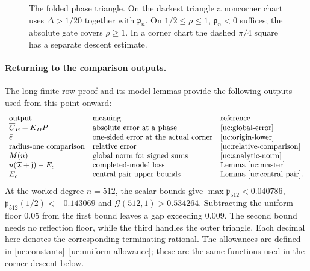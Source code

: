 \begin{figure}[ht]
\centering
{}
\caption{The folded phase triangle. On the darkest triangle a
noncorner chart uses $\Delta>1/20$ together with $\mathfrak p_n$.
On $1/2\leq\rho\leq1$, $\mathfrak p_n<0$ suffices; the absolute gate covers
$\rho\geq1$. In a corner chart the dashed $\pi/4$ square has a
separate descent estimate.}
\label{fig:phase-regions}
\end{figure}



\paragraph{Returning to the comparison outputs.}
The long finite-row proof and its model lemmas provide the following
outputs used from this point onward:
\[
\begin{array}{l@{\quad}l@{\quad}l}
\text{output}&\text{meaning}&\text{reference}\\
\overline C_E+K_DP&\text{absolute error at a phase}&\eqref{uc:global-error}\\
\bar e&\text{one-sided error at the actual corner}&\eqref{uc:origin-lower}\\
\text{radius-one comparison}&\text{relative error}&\eqref{uc:relative-comparison}\\
M(n)&\text{global norm for signed sums}&\eqref{uc:analytic-norm}\\
u(\mathfrak T+\mathfrak j)-E_c&\text{completed-model loss}&\text{Lemma~\ref{uc:master}}\\
E_c&\text{central-pair upper bounds}&\text{Lemma~\ref{uc:central-pair}}.
\end{array}
\]
At the worked degree $n=512$, the scalar bounds give
$\max \mathfrak p_{512}<0.040786$, $\mathfrak p_{512}(1/2)<-0.143069$ and
$\mathcal G(512,1)>0.534264$. Subtracting the uniform floor $0.05$ from
the first bound leaves a gap exceeding $0.009$. The second bound
needs no reflection floor, while the third handles the outer triangle.
Each decimal here denotes the corresponding terminating rational. The
allowances are defined in \eqref{uc:constants}--\eqref{uc:uniform-allowance};
these are the same functions used in the corner descent below.


